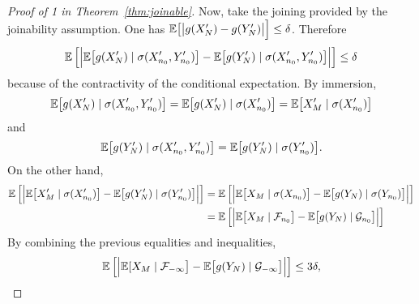 \documentclass[12pt,a4paper]{article}
\begin{document}
\begin{proof}[Proof of 1 in Theorem~\ref{thm:joinable}]
Now, take the joining provided by the joinability assumption. 
One has $\mathbb{E}\bigl[\bigl|g(X'_N) - g(Y'_N)\bigr|\Bigr] \leq \delta$. Therefore 
$$
\mathbb{E}\left[ \Bigr|\mathbb{E}\bigl[g(X'_N) \mid \sigma(X'_{n_0}, Y'_{n_0})\bigr] 
 - \mathbb{E}\bigl[g(Y'_N) \mid \sigma(X'_{n_0}, Y'_{n_0}) \bigr] \Bigl| \right] \leq \delta
$$
because of the contractivity of the conditional expectation. 
By immersion, 
$$
\mathbb{E}\bigl[g(X'_N) \mid \sigma(X'_{n_0}, Y'_{n_0})\bigr] 
= \mathbb{E}\bigl[g(X'_N) \mid \sigma(X'_{n_0})\bigr] = \mathbb{E}\bigl[X'_M \mid \sigma(X'_{n_0})\bigr]
$$
and 
$$
\mathbb{E}\bigl[g(Y'_N) \mid \sigma(X'_{n_0}, Y'_{n_0})\bigr] 
= \mathbb{E}\bigl[g(Y'_N) \mid \sigma(Y'_{n_0})\bigr]. 
$$
On the other hand, 
\begin{align*}
\mathbb{E}\left[ \Bigr| 
\mathbb{E}\bigl[X'_M \mid \sigma(X'_{n_0})\bigr] 
 - \mathbb{E}\bigl[g(Y'_N) \mid \sigma(Y'_{n_0})\bigr] 
\Bigl| \right] 
& = \mathbb{E}\left[ \Bigr| 
\mathbb{E}\bigl[X_M \mid \sigma(X_{n_0})\bigr] 
 - \mathbb{E}\bigl[g(Y_N) \mid \sigma(Y_{n_0})\bigr] 
\Bigl| \right] \\
& = \mathbb{E}\left[ \Bigr| 
\mathbb{E}\bigl[X_M \mid \mathcal{F}_{n_0}\bigr] 
 - \mathbb{E}\bigl[g(Y_N) \mid \mathcal{G}_{n_0}\bigr] 
\Bigl| \right]
\end{align*}
By combining the previous equalities and inequalities, 
$$
\mathbb{E}\left[ \Bigr| 
\mathbb{E}[X_M \mid \mathcal{F}_{-\infty}\bigr]  -  \mathbb{E}\bigl[g(Y_N) \mid \mathcal{G}_{-\infty}\bigr]
\Bigl| \right] 
\leq 3\delta,
$$
%
%
%
%
%
%

\end{proof}
\end{document}
